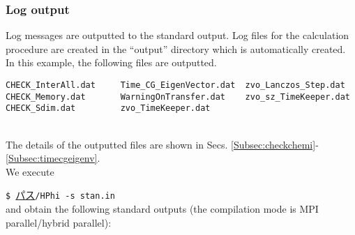 \subsubsection{Log output}
Log messages are outputted to the standard output.
Log files for the calculation procedure are created in the ``output'' directory
which is automatically created.
In this example, the following files are outputted.\\
\begin{minipage}{16cm}
\begin{screen}
\begin{verbatim}
CHECK_InterAll.dat     Time_CG_EigenVector.dat  zvo_Lanczos_Step.dat  
CHECK_Memory.dat       WarningOnTransfer.dat    zvo_sz_TimeKeeper.dat
CHECK_Sdim.dat         zvo_TimeKeeper.dat
\end{verbatim}
\end{screen}
\end{minipage}
\\
The details of the outputted files are shown in Secs.
\ref{Subsec:checkchemi}-\ref{Subsec:timecgeigenv}.
\\
We execute

\hspace{-0.7cm}
\verb|$ |\underline{パス}\verb|/HPhi -s stan.in|
\\
and obtain the following standard outputs
(the compilation mode is MPI parallel/hybrid parallel):

